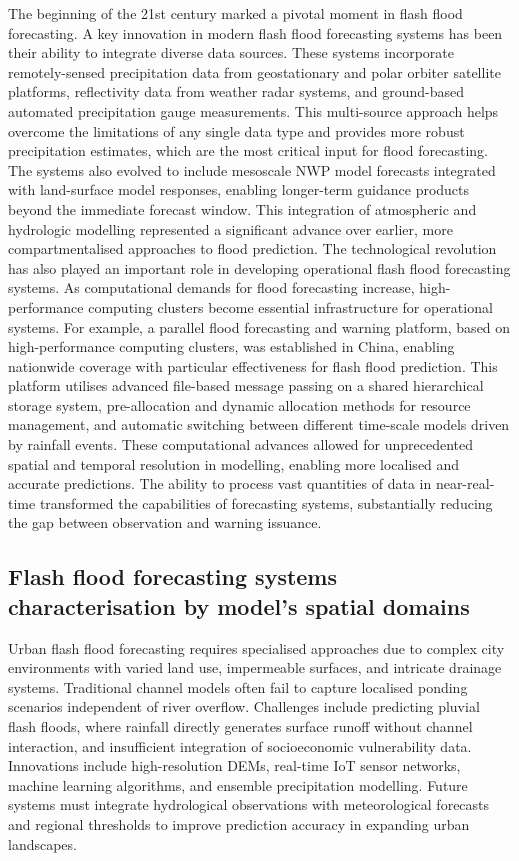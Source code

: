 The  beginning of the 21st century marked a pivotal moment in flash flood forecasting. A key innovation in modern flash flood forecasting systems has been their ability to integrate diverse data sources. These systems incorporate remotely-sensed precipitation data from geostationary and polar orbiter satellite platforms, reflectivity data from weather radar systems, and ground-based automated precipitation gauge measurements. This multi-source approach helps overcome the limitations of any single data type and provides more robust precipitation estimates, which are the most critical input for flood forecasting. The systems also evolved to include mesoscale NWP model forecasts integrated with land-surface model responses, enabling longer-term guidance products beyond the immediate forecast window. This integration of atmospheric and hydrologic modelling represented a significant advance over earlier, more compartmentalised approaches to flood prediction. The technological revolution has also played an important role in developing operational flash flood forecasting systems. As computational demands for flood forecasting increase, high-performance computing clusters become essential infrastructure for operational systems. For example, a parallel flood forecasting and warning platform, based on high-performance computing clusters, was established in China, enabling nationwide coverage with particular effectiveness for flash flood prediction. This platform utilises advanced file-based message passing on a shared hierarchical storage system, pre-allocation and dynamic allocation methods for resource management, and automatic switching between different time-scale models driven by rainfall events. These computational advances allowed for unprecedented spatial and temporal resolution in modelling, enabling more localised and accurate predictions. The ability to process vast quantities of data in near-real-time transformed the capabilities of forecasting systems, substantially reducing the gap between observation and warning issuance.


\subsection{Flash flood forecasting systems characterisation by model's spatial domains}

Urban  flash flood forecasting requires specialised approaches due to complex city environments with varied land use, impermeable surfaces, and intricate drainage systems. Traditional channel models often fail to capture localised ponding scenarios independent of river overflow. Challenges include predicting pluvial flash floods, where rainfall directly generates surface runoff without channel interaction, and insufficient integration of socioeconomic vulnerability data. Innovations include high-resolution DEMs, real-time IoT sensor networks, machine learning algorithms, and ensemble precipitation modelling. Future systems must integrate hydrological observations with meteorological forecasts and regional thresholds to improve prediction accuracy in expanding urban landscapes. 

